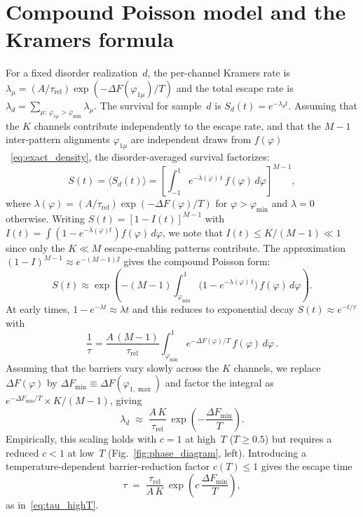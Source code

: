 \documentclass[11pt]{article}
\newcommand{\avg}[1]{\langle #1 \rangle}
\begin{document}
\section{Compound Poisson model and the Kramers formula}
\label{app:compound_poisson}

For a fixed disorder realization~$d$, the per-channel Kramers rate is $\lambda_\mu = (A/\tau_{\mathrm{rel}})\exp(-\Delta F(\varphi_{1\mu})/T)$ and the total escape rate is $\lambda_d = \sum_{\mu:\,\varphi_{1\mu}>\varphi_{\min}} \lambda_\mu$.  The survival for sample~$d$ is $S_d(t) = e^{-\lambda_d t}$.  Assuming that the $K$ channels contribute independently to the escape rate, and that the $M-1$ inter-pattern alignments $\varphi_{1\mu}$ are independent draws from $f(\varphi)$~\eqref{eq:exact_density}, the disorder-averaged survival factorizes:
\begin{equation}
S(t) = \avg{S_d(t)} = \left[\int_{-1}^{1} e^{-\lambda(\varphi)\,t}\,f(\varphi)\,d\varphi\right]^{M-1},
\label{eq:compound_poisson_exact}
\end{equation}
where $\lambda(\varphi) = (A/\tau_{\mathrm{rel}})\exp(-\Delta F(\varphi)/T)$ for $\varphi > \varphi_{\min}$ and $\lambda = 0$ otherwise.  Writing $S(t) = [1 - I(t)]^{M-1}$ with $I(t) = \int(1-e^{-\lambda(\varphi)t})f(\varphi)\,d\varphi$, we note that $I(t) \leq K/(M{-}1) \ll 1$ since only the $K \ll M$ escape-enabling patterns contribute.  The approximation $(1-I)^{M-1} \approx e^{-(M-1)I}$ gives the compound Poisson form:
\begin{equation}
S(t) \approx \exp\!\left(-(M{-}1)\!\int_{\varphi_{\min}}^{1}\!\bigl(1 - e^{-\lambda(\varphi)\,t}\bigr)\,f(\varphi)\,d\varphi\right).
\label{eq:compound_poisson}
\end{equation}
At early times, $1 - e^{-\lambda t} \approx \lambda t$ and this reduces to exponential decay $S(t) \approx e^{-t/\tau}$ with
\begin{equation}
\frac{1}{\tau} = \frac{A\,(M{-}1)}{\tau_{\mathrm{rel}}}\int_{\varphi_{\min}}^{1} e^{-\Delta F(\varphi)/T}\,f(\varphi)\,d\varphi\,.
\label{eq:tau_integral}
\end{equation}
Assuming that the barriers vary slowly across the $K$ channels, we replace $\Delta F(\varphi)$ by $\Delta F_{\min} \equiv \Delta F(\varphi_{1,\max})$ and factor the integral as $e^{-\Delta F_{\min}/T} \times K/(M{-}1)$, giving
\begin{equation}
\lambda_d \;\approx\; \frac{A\,K}{\tau_{\mathrm{rel}}}\,\exp\!\left(-\frac{\Delta F_{\min}}{T}\right).
\label{eq:lambda_simple}
\end{equation}
Empirically, this scaling holds with $c = 1$ at high~$T$ ($T \geq 0.5$) but requires a reduced $c < 1$ at low~$T$ (Fig.~\ref{fig:phase_diagram}, left).  Introducing a temperature-dependent barrier-reduction factor $c(T) \leq 1$ gives the escape time
\begin{equation}
\tau \;=\; \frac{\tau_{\mathrm{rel}}}{A\,K}\,\exp\!\left(c\,\frac{\Delta F_{\min}}{T}\right),
\label{eq:kramers_rate_app}
\end{equation}
as in~\eqref{eq:tau_highT}.
\end{document}
